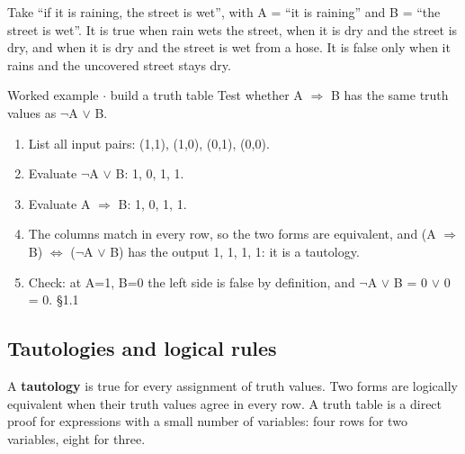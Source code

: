 \documentclass[11pt]{article}
\begin{document}
\begin{keepsection}
\begin{keepsection}
Take “if it is raining, the street is wet”, with A = “it is raining” and B = “the street is wet”. It is true when rain wets the street, when it is dry and the street is dry, and when it is dry and the street is wet from a hose. It is false only when it rains and the uncovered street stays dry.

\begin{workedbox}{Worked example \ensuremath{\cdot} build a truth table}
Test whether A \ensuremath{\Rightarrow} B has the same truth values as \ensuremath{\neg}A \ensuremath{\lor} B.

\begin{enumerate}
\item List all input pairs: (1,1), (1,0), (0,1), (0,0).
\item Evaluate \ensuremath{\neg}A \ensuremath{\lor} B: 1, 0, 1, 1.
\item Evaluate A \ensuremath{\Rightarrow} B: 1, 0, 1, 1.
\item The columns match in every row, so the two forms are equivalent, and (A \ensuremath{\Rightarrow} B) \ensuremath{\Leftrightarrow} (\ensuremath{\neg}A \ensuremath{\lor} B) has the output 1, 1, 1, 1: it is a tautology.
\item Check: at A=1, B=0 the left side is false by definition, and \ensuremath{\neg}A \ensuremath{\lor} B = 0 \ensuremath{\lor} 0 = 0. \hfill{\small\color{FAUblue}§1.1}
\end{enumerate}
\end{workedbox}
\end{keepsection}

\begin{keepsection}
\subsection{Tautologies and logical rules}

A \textbf{tautology} is true for every assignment of truth values. Two forms are logically equivalent when their truth values agree in every row. A truth table is a direct proof for expressions with a small number of variables: four rows for two variables, eight for three.


\end{keepsection}
\end{keepsection}
\end{document}
